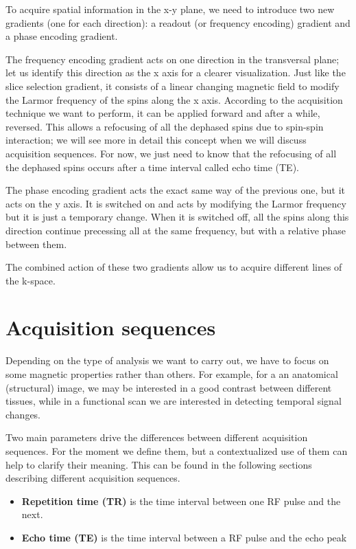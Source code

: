 \documentclass[11pt]{report}
\begin{document}
To acquire spatial information in the x-y plane, we need to introduce two new gradients (one for each direction): a readout (or frequency encoding) gradient and a phase encoding gradient.

The frequency encoding gradient acts on one direction in the transversal plane; let us identify this direction as the x axis for a clearer visualization.
Just like the slice selection gradient, it consists of a linear changing magnetic field to modify the Larmor frequency of the spins along the x axis. According to the acquisition technique we want to perform, it can be applied forward and after a while, reversed. This allows a refocusing of all the dephased spins due to spin-spin interaction; we will see more in detail this concept when we will discuss acquisition sequences. For now, we just need to know that the refocusing of all the dephased spins occurs after a time interval called echo time (TE).

The phase encoding gradient acts the exact same way of the previous one, but it acts on the y axis. It is switched on and acts by modifying the Larmor frequency but it is just a temporary change. When it is switched off, all the spins along this direction continue precessing all at the same frequency, but with a relative phase between them.

The combined action of these two gradients allow us to acquire different lines of the k-space.



\section{Acquisition sequences}
Depending on the type of analysis we want to carry out, we have to focus on some magnetic properties rather than others.
For example, for a an anatomical (structural) image, we may be interested in a good contrast between different tissues, while in a functional scan we are interested in detecting temporal signal changes.

Two main parameters drive the differences between different acquisition sequences.
For the moment we define them, but a contextualized use of them can help to clarify their meaning.
This can be found in the following sections describing different acquisition sequences.

\begin{itemize}
\item \textbf{Repetition time (TR)} is the time interval between one RF pulse and the next.
\item \textbf{Echo time (TE)} is the time interval between a RF pulse and the echo peak
\end{itemize}
\end{document}
